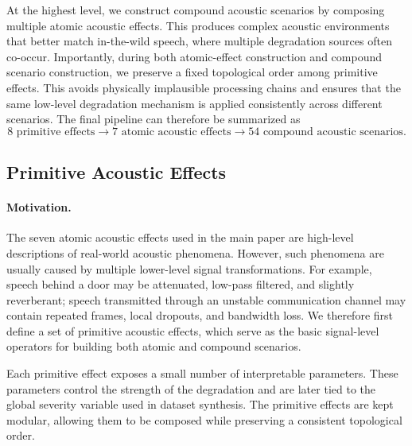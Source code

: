 \documentclass{article}
\begin{document}
At the highest level, we construct compound acoustic scenarios by composing
multiple atomic acoustic effects. This produces complex acoustic environments
that better match in-the-wild speech, where multiple degradation sources often
co-occur. Importantly, during both atomic-effect construction and compound
scenario construction, we preserve a fixed topological order among primitive
effects. This avoids physically implausible processing chains and ensures that
the same low-level degradation mechanism is applied consistently across
different scenarios. The final pipeline can therefore be summarized as
\[
\text{8 primitive effects}
\rightarrow
\text{7 atomic acoustic effects}
\rightarrow
\text{54 compound acoustic scenarios}.
\]
\subsection{Primitive Acoustic Effects}

\paragraph{Motivation.}
The seven atomic acoustic effects used in the main paper are high-level
descriptions of real-world acoustic phenomena. However, such phenomena are
usually caused by multiple lower-level signal transformations. For example,
speech behind a door may be attenuated, low-pass filtered, and slightly
reverberant; speech transmitted through an unstable communication channel may
contain repeated frames, local dropouts, and bandwidth loss. We therefore first
define a set of primitive acoustic effects, which serve as the basic
signal-level operators for building both atomic and compound scenarios.

Each primitive effect exposes a small number of interpretable parameters. These
parameters control the strength of the degradation and are later tied to the
global severity variable used in dataset synthesis. The primitive effects are
kept modular, allowing them to be composed while preserving a consistent
topological order.
\end{document}
